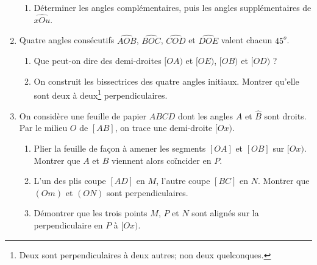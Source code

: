 \begin{enumerate}
\begin{enumerate}
\item Déterminer les angles complémentaires, puis les angles supplémentaires de $\widehat{xOu}$. 
\end{enumerate}
\item Quatre angles consécutifs $\widehat{AOB}$, $\widehat{BOC}$, $\widehat{COD}$ et $\widehat{DOE}$ valent chacun $45^o$. 
\begin{enumerate}
\item Que peut-on dire des demi-droites $[OA)$ et $[OE)$, $[OB)$ et $[OD)$ ?
\item On construit les bissectrices des quatre angles initiaux. Montrer qu'elle sont deux à deux\footnote{Deux sont perpendiculaires à deux autres; non deux quelconques.} perpendiculaires. 
\end{enumerate}
\item On considère une feuille de papier $ABCD$ dont les angles $\widehat{A}$ et $\widehat{B}$ sont droits. Par le milieu $O$ de $[AB]$, on trace une demi-droite 
$[Ox)$.\begin{enumerate}
\item Plier la feuille de façon à amener les segments $[OA]$ et $[OB]$ sur $[Ox)$. 
Montrer que $A$ et $B$ viennent alors coïncider en $P$.
\item L'un des plis coupe $[AD]$ en $M$, l'autre coupe $[BC]$ en $N$. Montrer que $(Om)$ et $(ON)$ sont perpendiculaires.
\item Démontrer que les trois points $M$, $P$ et $N$ sont alignés sur la perpendiculaire en $P$ à $[Ox)$.
\end{enumerate}
\end{enumerate}